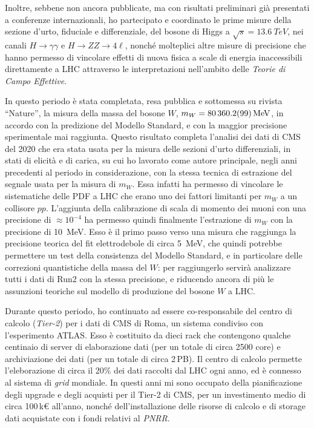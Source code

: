 \documentclass[a4paper,12pt,twoside]{article}
\begin{document}
{ Inoltre, sebbene non ancora pubblicate, ma con risultati
 preliminari gi\`a presentati a conferenze internazionali, ho
 partecipato e coordinato le prime misure della sezione d'urto,
 fiduciale e differenziale, del bosone di Higgs a
 $\sqrt{s}=\SI{13.6}{TeV}$, nei canali $H\to\gamma\gamma$ e
 $H\to ZZ\to 4\ell$, nonch\'e molteplici altre misure di precisione che
 hanno permesso di vincolare effetti di nuova fisica a scale di
 energia inaccessibili direttamente a LHC attraverso le
 interpretazioni nell'ambito delle {\it Teorie di Campo Effettive}.

In questo periodo \`e stata completata, resa pubblica e sottomessa su
rivista ``Nature'', la misura della massa del bosone $W$,
$m_W=\SI{80360.2\pm 9.9}{MeV}$, in accordo con la predizione del
Modello Standard, e con la maggior precisione sperimentale mai
raggiunta. Questo risultato completa l'analisi dei dati di CMS del 2020
che era stata usata per la misura delle sezioni d'urto
differenziali, in stati di elicit\`a e di carica, su cui ho lavorato
come autore principale, negli anni precedenti al periodo in
considerazione, con la stessa tecnica di estrazione del segnale usata
per la misura di $m_W$. Essa infatti ha permesso di vincolare le
sistematiche delle PDF a LHC che erano uno dei fattori limitanti per $m_W$ a un
collisore $pp$. L'aggiunta della calibrazione di scala di momento dei muoni con una precisione di
$\approx 10^{-4}$ ha permesso quindi finalmente l'estrazione di $m_W$ con la precisione
di \SI{10}{MeV}. Esso \`e il primo passo verso una misura che
raggiunga la precisione teorica del fit elettrodebole di circa
\SI{5}{MeV}, che quindi potrebbe permettere un test della consistenza
del Modello Standard, e in particolare delle correzioni quantistiche
della massa del $W$: per raggiungerlo servir\`a analizzare tutti i
dati di Run2 con la stessa precisione, e riducendo ancora di pi\`u le
assunzioni teoriche sul modello di produzione del bosone $W$ a LHC.
 
Durante questo periodo, ho continuato ad essere
co-responsabile del centro di calcolo (\textit{Tier-2}) per i dati di
CMS di Roma, un sistema condiviso con l'esperimento ATLAS. Esso \`e
costituito da dieci rack che contengono qualche centinaio di server di
elaborazione dati (per un totale di circa 2500 core) e archiviazione
dei dati (per un totale di circa 2\,PB). Il centro di calcolo permette
l'eleborazione di circa il 20\% dei dati raccolti dal LHC ogni anno,
ed \`e connesso al sistema di \textit{grid} mondiale. In questi anni
mi sono occupato della pianificazione degli upgrade e degli acquisti
per il Tier-2 di CMS, per un investimento medio di circa 100\,k\euro{}
all'anno, nonch\'e dell'installazione delle risorse di calcolo e di
storage dati acquistate con i fondi relativi al {\it PNRR}.

}
\end{document}
